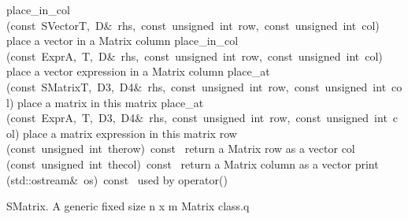 \documentclass{article}
\begin{document}
\begin{cxxentry}
\begin{cxxclass}
\begin{cxxpublic}
        {place\_in\_col}
        {(const\ SVector\<T,\ D\>\&\ rhs,\ const\ unsigned\ int\ row,\ const\ unsigned\ int\ col)}
        { place a vector in a Matrix column}
        {}
\label{cxx.1.2.50}
        {place\_in\_col}
        {(const\ Expr\<A,\ T,\ D\>\&\ rhs,\ const\ unsigned\ int\ row,\ const\ unsigned\ int\ col)}
        { place a vector expression in a Matrix column}
        {}
\label{cxx.1.2.51}
        {place\_at}
        {(const\ SMatrix\<T,\ D3,\ D4\>\&\ rhs,\ const\ unsigned\ int\ row,\ const\ unsigned\ int\ col)}
        { place a matrix in this matrix}
        {}
\label{cxx.1.2.52}
        {place\_at}
        {(const\ Expr\<A,\ T,\ D3,\ D4\>\&\ rhs,\ const\ unsigned\ int\ row,\ const\ unsigned\ int\ col)}
        { place a matrix expression in this matrix}
        {}
\label{cxx.1.2.53}
        {row}
        {(const\ unsigned\ int\ therow)\ const\ }
        { return a Matrix row as a vector}
        {}
\label{cxx.1.2.54}
        {col}
        {(const\ unsigned\ int\ thecol)\ const\ }
        { return a Matrix column as a vector}
        {}
\label{cxx.1.2.55}
        {print}
        {(std::ostream\&\ os)\ const\ }
        { used by operator\<\<()}
        {}
\label{cxx.1.2.56}
\end{cxxpublic}
\begin{cxxdoc}
SMatrix.
A generic fixed size n x m Matrix class.q



\end{cxxdoc}
\end{cxxclass}
\end{cxxentry}
\end{document}

